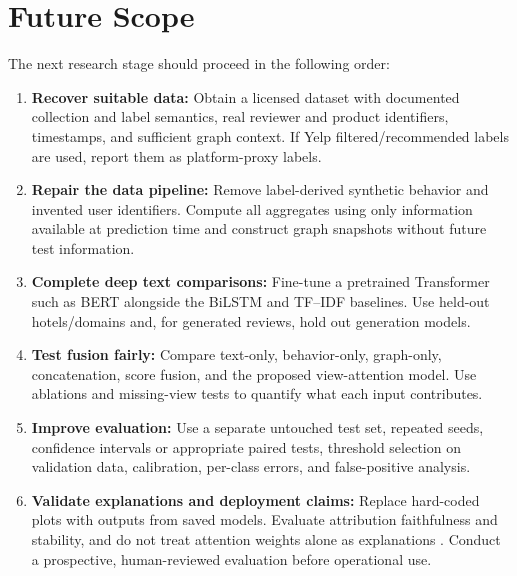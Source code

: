 \documentclass[12pt,a4paper]{report}
\begin{document}
\section{Future Scope}

The next research stage should proceed in the following order:

\begin{enumerate}
    \item \textbf{Recover suitable data:} Obtain a licensed dataset with documented collection and label semantics, real reviewer and product identifiers, timestamps, and sufficient graph context. If Yelp filtered/recommended labels are used, report them as platform-proxy labels.
    \item \textbf{Repair the data pipeline:} Remove label-derived synthetic behavior and invented user identifiers. Compute all aggregates using only information available at prediction time and construct graph snapshots without future test information.
    \item \textbf{Complete deep text comparisons:} Fine-tune a pretrained Transformer such as BERT alongside the BiLSTM and TF--IDF baselines. Use held-out hotels/domains and, for generated reviews, hold out generation models.
    \item \textbf{Test fusion fairly:} Compare text-only, behavior-only, graph-only, concatenation, score fusion, and the proposed view-attention model. Use ablations and missing-view tests to quantify what each input contributes.
    \item \textbf{Improve evaluation:} Use a separate untouched test set, repeated seeds, confidence intervals or appropriate paired tests, threshold selection on validation data, calibration, per-class errors, and false-positive analysis.
    \item \textbf{Validate explanations and deployment claims:} Replace hard-coded plots with outputs from saved models. Evaluate attribution faithfulness and stability, and do not treat attention weights alone as explanations \cite{jain2019}. Conduct a prospective, human-reviewed evaluation before operational use.
\end{enumerate}

\clearpage


\end{document}
